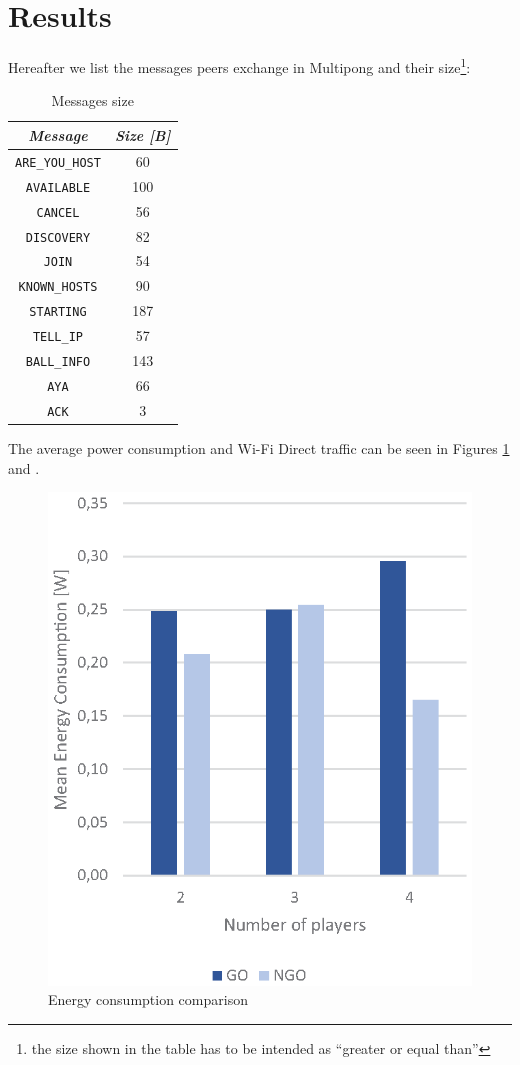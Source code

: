 \section{Results}

Hereafter we list the messages peers exchange in Multipong and their
size\footnote{the size shown in the table has to be intended as ``greater or
equal than''}:

\begin{table}[H]
  \centering
  \begin{tabular}{cc}
    \textbf{\textit{Message}} & \textbf{\textit{Size [B]}} \\
    \hline
    \texttt{ARE\_YOU\_HOST} & 60 \\
    \hline
    \texttt{AVAILABLE} & 100 \\
    \hline
    \texttt{CANCEL} & 56 \\
    \hline
    \texttt{DISCOVERY} & 82 \\
    \hline
    \texttt{JOIN} & 54 \\
    \hline
    \texttt{KNOWN\_HOSTS} & 90 \\
    \hline
    \texttt{STARTING} & 187 \\
    \hline
    \texttt{TELL\_IP} & 57 \\
    \hline
    \texttt{BALL\_INFO} & 143 \\
    \hline
    \texttt{AYA} & 66 \\
    \hline
    \texttt{ACK} & 3 \\
    \hline
  \end{tabular}
  \caption{Messages size}
  \label{tab:sizes}
\end{table}

The average power consumption and Wi-Fi Direct traffic can be seen in Figures
\ref{fig:energy} and .

\begin{figure}[H]
  \centering
  \includegraphics[width=.6\columnwidth]{img/energy.eps}
  \caption{Energy consumption comparison}
  \label{fig:energy}
\end{figure}


